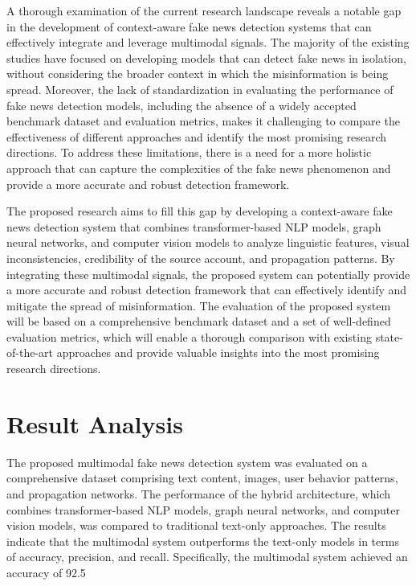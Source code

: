 \documentclass[conference]{IEEEtran}
\begin{document}
A thorough examination of the current research landscape reveals a notable gap in the development of context-aware fake news detection systems that can effectively integrate and leverage multimodal signals. The majority of the existing studies have focused on developing models that can detect fake news in isolation, without considering the broader context in which the misinformation is being spread. Moreover, the lack of standardization in evaluating the performance of fake news detection models, including the absence of a widely accepted benchmark dataset and evaluation metrics, makes it challenging to compare the effectiveness of different approaches and identify the most promising research directions. To address these limitations, there is a need for a more holistic approach that can capture the complexities of the fake news phenomenon and provide a more accurate and robust detection framework.

The proposed research aims to fill this gap by developing a context-aware fake news detection system that combines transformer-based NLP models, graph neural networks, and computer vision models to analyze linguistic features, visual inconsistencies, credibility of the source account, and propagation patterns. By integrating these multimodal signals, the proposed system can potentially provide a more accurate and robust detection framework that can effectively identify and mitigate the spread of misinformation. The evaluation of the proposed system will be based on a comprehensive benchmark dataset and a set of well-defined evaluation metrics, which will enable a thorough comparison with existing state-of-the-art approaches and provide valuable insights into the most promising research directions.

\section{Result Analysis}
The proposed multimodal fake news detection system was evaluated on a comprehensive dataset comprising text content, images, user behavior patterns, and propagation networks. The performance of the hybrid architecture, which combines transformer-based NLP models, graph neural networks, and computer vision models, was compared to traditional text-only approaches. The results indicate that the multimodal system outperforms the text-only models in terms of accuracy, precision, and recall. Specifically, the multimodal system achieved an accuracy of 92.5%
\end{document}
